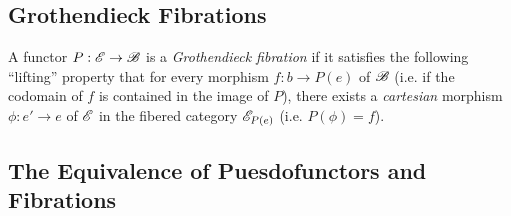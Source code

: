 \documentclass[10pt]{article}
\theoremstyle{definition}
\theoremstyle{remark}
\begin{document}
\subsection{Grothendieck Fibrations}

A functor $P : \mathscr{E} \to \mathscr{B}$ is a \textit{Grothendieck fibration} if it satisfies the following ``lifting'' property that for every morphism $f : b \to P(e)$ of $\mathscr{B}$ (i.e. if the codomain of $f$ is contained in the image of $P$), there exists a \textit{cartesian} morphism $\phi : e' \to e$ of $\mathscr{E}$ in the fibered category $\mathscr{E}_{P(e)}$ (i.e. $P(\phi) = f$).

\subsection{The Equivalence of Puesdofunctors and Fibrations}
\end{document}
